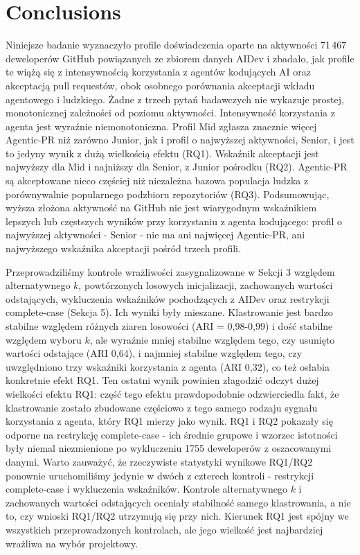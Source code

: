 \section{Conclusions\label{sec:conclusions}}
Niniejsze badanie wyznaczyło profile doświadczenia oparte na aktywności 71\,467 deweloperów GitHub powiązanych ze zbiorem danych AIDev i zbadało, jak profile te wiążą się z intensywnością korzystania z agentów kodujących AI oraz akceptacją pull requestów, obok osobnego porównania akceptacji wkładu agentowego i ludzkiego. Żadne z trzech pytań badawczych nie wykazuje prostej, monotonicznej zależności od poziomu aktywności. Intensywność korzystania z agenta jest wyraźnie niemonotoniczna. Profil Mid zgłasza znacznie więcej Agentic-PR niż zarówno Junior, jak i profil o najwyższej aktywności, Senior, i jest to jedyny wynik z dużą wielkością efektu (RQ1). Wskaźnik akceptacji jest najwyższy dla Mid i najniższy dla Senior, z Junior pośrodku (RQ2). Agentic-PR są akceptowane nieco częściej niż niezależna bazowa populacja ludzka z porównywalnie popularnego podzbioru repozytoriów (RQ3). Podsumowując, wyższa złożona aktywność na GitHub nie jest wiarygodnym wskaźnikiem lepszych lub częstszych wyników przy korzystaniu z agenta kodującego: profil o najwyższej aktywności - Senior - nie ma ani najwięcej Agentic-PR, ani najwyższego wskaźnika akceptacji pośród trzech profili.

Przeprowadziliśmy kontrole wrażliwości zasygnalizowane w Sekcji 3 względem alternatywnego $k$, powtórzonych losowych inicjalizacji, zachowanych wartości odstających, wykluczenia wskaźników pochodzących z AIDev oraz restrykcji complete-case (Sekcja 5). Ich wyniki były mieszane. Klastrowanie jest bardzo stabilne względem różnych ziaren losowości (ARI = 0,98-0,99) i dość stabilne względem wyboru $k$, ale wyraźnie mniej stabilne względem tego, czy usunięto wartości odstające (ARI 0,64), i najmniej stabilne względem tego, czy uwzględniono trzy wskaźniki korzystania z agenta (ARI 0,32), co też osłabia konkretnie efekt RQ1. Ten ostatni wynik powinien złagodzić odczyt dużej wielkości efektu RQ1: część tego efektu prawdopodobnie odzwierciedla fakt, że klastrowanie zostało zbudowane częściowo z tego samego rodzaju sygnału korzystania z agenta, który RQ1 mierzy jako wynik. RQ1 i RQ2 pokazały się odporne na restrykcję complete-case - ich średnie grupowe i wzorzec istotności były niemal niezmienione po wykluczeniu 1755 deweloperów z oszacowanymi danymi. Warto zauważyć, że rzeczywiste statystyki wynikowe RQ1/RQ2 ponownie uruchomiliśmy jedynie w dwóch z czterech kontroli - restrykcji complete-case i wykluczenia wskaźników. Kontrole alternatywnego $k$ i zachowanych wartości odstających oceniały stabilność samego klastrowania, a nie to, czy wnioski RQ1/RQ2 utrzymują się przy nich. Kierunek RQ1 jest spójny we wszystkich przeprowadzonych kontrolach, ale jego wielkość jest najbardziej wrażliwa na wybór projektowy.

